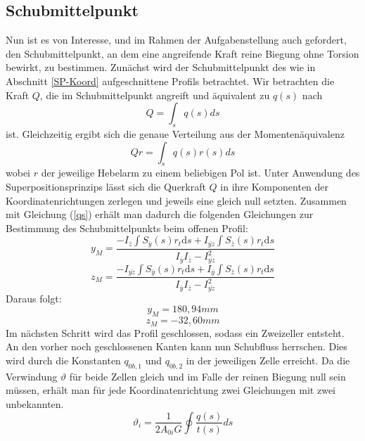 \subsection{Schubmittelpunkt}
Nun ist es von Interesse, und im Rahmen der Aufgabenstellung auch gefordert, den Schubmittelpunkt, an dem eine angreifende Kraft reine Biegung ohne Torsion bewirkt, zu bestimmen.
Zunächst wird der Schubmittelpunkt des wie in Abschnitt \ref{SP-Koord} aufgeschnittene Profils betrachtet. Wir betrachten die Kraft $Q$, die im Schubmittelpunkt angreift und äquivalent zu $q(s)$ nach
\begin{equation}
	Q=\int_{s}^{}q(s)ds
\end{equation}
ist. Gleichzeitig ergibt sich die genaue Verteilung aus der Momentenäquivalenz 
\begin{equation}
	Qr=\int_{s}q(s)r(s)ds
\end{equation}
wobei $r$ der jeweilige Hebelarm zu einem beliebigen Pol ist. Unter Anwendung des Superpositionsprinzips lässt sich die Querkraft $Q$ in ihre Komponenten der  Koordinatenrichtungen zerlegen und jeweils eine gleich null setzten. Zusammen mit Gleichung (\ref{qs}) erhält man dadurch die folgenden Gleichungen zur Bestimmung des Schubmittelpunkts beim offenen Profil:
\begin{equation}
	y_{M}=\frac{-I_{\bar{z}}\int S_{\bar{y}}(s) r_{t}\mathrm{d}s+I_{\bar{yz}}\int S_{\bar{z}}(s) r_{t}\mathrm{d}s}{I_{\bar{y}}I_{\bar{z}}-I_{\bar{yz}}^2}
\end{equation}
\begin{equation}
	z_{M}=\frac{-I_{\bar{yz}}\int S_{\bar{y}}(s) r_{t}\mathrm{d}s+I_{\bar{y}}\int S_{\bar{z}}(s) r_{t}\mathrm{d}s}{I_{\bar{y}}I_{\bar{z}}-I_{\bar{yz}}^2}
\end{equation}
Daraus folgt:
\begin{equation}
	y_{M}=180,94mm
\end{equation}
\begin{equation}
	z_{M}=-32,60mm
\end{equation}
Im nächsten Schritt wird das Profil geschlossen, sodass ein Zweizeller entsteht. An den vorher noch geschlossenen Kanten kann nun Schubfluss herrschen. Dies wird durch die Konstanten $q_{0b,1}$ und $q_{0b,2}$ in der jeweiligen Zelle erreicht.
Da die Verwindung $\vartheta$ für beide Zellen gleich und im Falle der reinen Biegung null sein müssen, erhält man für jede Koordinatenrichtung zwei Gleichungen mit zwei unbekannten.
\begin{equation}\label{verdrillung}
	\vartheta_{i} = \frac{1}{2A_{0i}G}\oint\frac{q(s)}{t(s)}ds
\end{equation}
